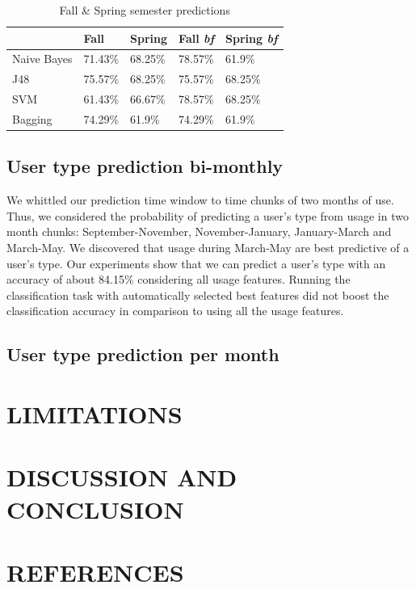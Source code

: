 \documentclass{acm_proc_article-sp}
\begin{document}
\begin{table}

\caption{Fall \& Spring semester predictions}
\label{semesterprediction}
\begin{tabular}{|l|l|l||l|l|}
	\hline
	 & \textbf{Fall} & \textbf{Spring} & \textbf{Fall \textit{bf}} & \textbf{Spring \textit{bf}}\\ \hline
    Naive Bayes & 71.43\% & 68.25\% & 78.57\%  & 61.9\%\\ \hline
    J48 & 75.57\% & 68.25\% & 75.57\%  &  68.25\% \\ \hline
    SVM & 61.43\% & 66.67\% & 78.57\% & 68.25\%  \\ \hline
	Bagging & 74.29\% & 61.9\%  & 74.29\%  & 61.9\%\\ \hline

\end{tabular}
\end{table}

\subsection{User type prediction bi-monthly}
We whittled our prediction time window to time chunks of two months of use. Thus, we considered the probability of predicting a user's type from usage in two month chunks: September-November, November-January, January-March and March-May. We discovered that usage during March-May are best predictive of a user's type. Our experiments show that we can predict a user's type with an accuracy of about 84.15\% considering all usage features. Running the classification task with automatically selected best features did not boost the classification accuracy in comparison to using all the usage features.

\subsection{User type prediction per month}




\section{LIMITATIONS}

\section{DISCUSSION AND CONCLUSION}

\section{REFERENCES}

  
\end{document}
